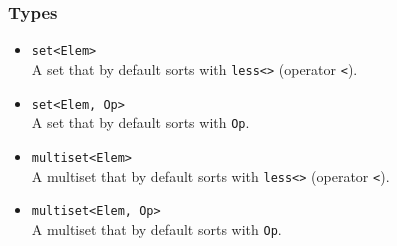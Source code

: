 \documentclass{report}
\begin{document}
\bigbreak \noindent 
\subsubsection{Types}
\bigbreak \noindent \bigbreak \noindent 
\begin{itemize}
    \item \texttt{set<Elem>} \\
    A set that by default sorts with \texttt{less<>} (operator \texttt{<}).
    
    \item \texttt{set<Elem, Op>} \\
    A set that by default sorts with \texttt{Op}.
    
    \item \texttt{multiset<Elem>} \\
    A multiset that by default sorts with \texttt{less<>} (operator \texttt{<}).
    
    \item \texttt{multiset<Elem, Op>} \\
    A multiset that by default sorts with \texttt{Op}.
\end{itemize}
\pagebreak 
\end{document}
